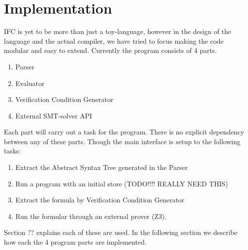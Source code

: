 \section{Implementation}
IFC is yet to be more than just a toy-language, however in the design of the language and the actual compiler, we have tried to focus making the code modular and easy to extend.
Currently the program consists of 4 parts.
\begin{enumerate}
  \item Parser
  \item Evaluator
  \item Verification Condition Generator
  \item External SMT-solver API
\end{enumerate}
Each part will carry out a task for the program. There is no explicit dependency between any of these parts. Though the main interface is setup to the following tasks:
\begin{enumerate}
  \item Extract the Abstract Syntax Tree generated in the Parser
  \item Run a program with an initial store (TODO!!!! REALLY NEED THIS)
  \item Extract the formula by Verification Condition Generator
  \item Run the formular through an external prover (Z3).
\end{enumerate}
Section ?? explains each of these are used. In the following section we describe how each the 4 program parts are implemented.

